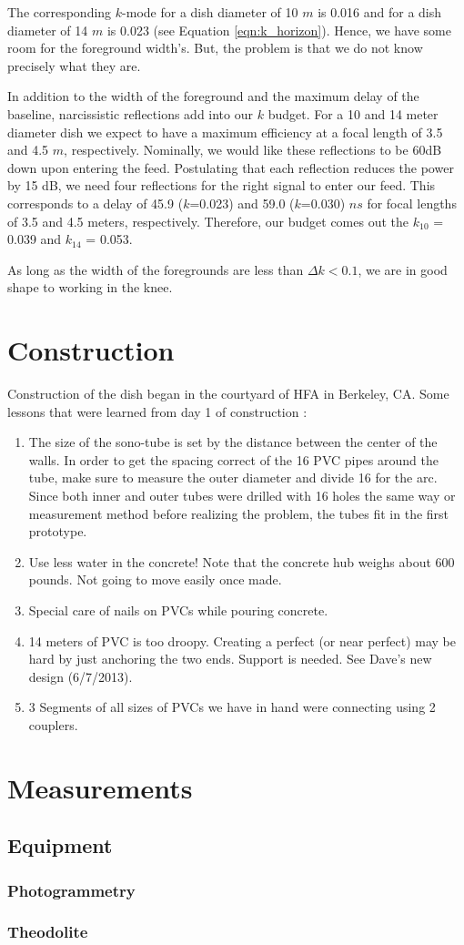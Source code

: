 \documentclass[11pt]{article}
\begin{document}
The corresponding $k$-mode for a dish diameter of 10 $m$ is 0.016 and for a dish
diameter of 14 $m$ is 0.023 (see Equation \ref{eqn:k_horizon}). Hence, we have
some room for the foreground width's. But, the problem is that we do not know
precisely what they are. 

In addition to the width of the foreground and the maximum delay of the
baseline, narcissistic reflections add into our $k$ budget. For a 10 and 14
meter diameter dish we expect to have a maximum efficiency at a focal length of
3.5 and 4.5 $m$, respectively. Nominally, we would like these reflections to be
60dB down upon entering the feed. Postulating that each reflection reduces the
power by 15 dB, we need four reflections for the right signal to enter our feed.
This corresponds to a delay of 45.9 ($k$=0.023)  and 59.0 ($k$=0.030) $ns$ for
focal lengths of 3.5 and 4.5 meters, respectively. Therefore, our budget comes
out the $k_{10}$ = 0.039 and $k_{14}$ = 0.053.

As long as the width of the foregrounds are less than $\Delta k < 0.1$, we are
in good shape to working in the knee. 


\section{Construction}
Construction of the dish began in the courtyard of HFA in Berkeley, CA.
Some lessons that were learned from day 1 of construction :
\begin{enumerate}
    \item{The size of the sono-tube is set by the distance between the center of
the walls. In order to get the spacing correct of the 16 PVC pipes around the
tube, make sure to measure the outer diameter and divide 16 for the arc. Since both inner
and outer tubes were drilled with 16 holes the same way or measurement
method before realizing the problem, the tubes fit in the first
prototype.}
    \item{Use less water in the concrete! Note that the concrete hub weighs
about 600 pounds. Not going to move easily once made.}
    \item{Special care of nails on PVCs while pouring concrete.}
    \item{14 meters of PVC is too droopy. Creating a perfect (or near perfect)
may be hard by just anchoring the two ends. Support is needed. See Dave's new
design (6/7/2013).}
    \item{3 Segments of all sizes of PVCs we have in hand were connecting using 2 couplers.}
\end{enumerate}


\section{Measurements}
\subsection{Equipment}
\subsubsection{Photogrammetry}
\subsubsection{Theodolite}
\end{document}

